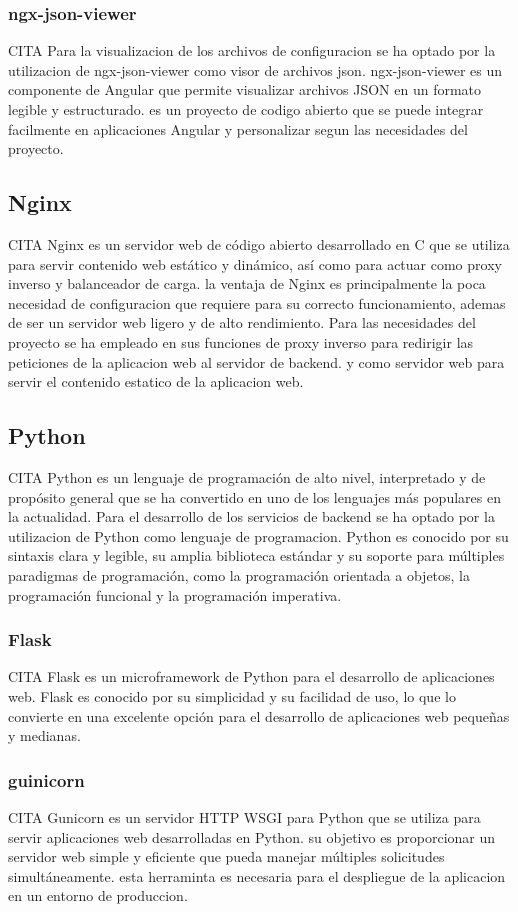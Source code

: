 \documentclass[12pt, a4paper, twoside]{article}
\begin{document}
\subsubsection{ngx-json-viewer}
CITA
Para la visualizacion de los archivos de configuracion se ha optado por la utilizacion de ngx-json-viewer como visor de archivos json.
ngx-json-viewer es un componente de Angular que permite visualizar archivos JSON en un formato legible y estructurado.
es un proyecto de codigo abierto que se puede integrar facilmente en aplicaciones Angular y personalizar segun las necesidades del proyecto.

\subsection{Nginx}
CITA 
Nginx es un servidor web de código abierto desarrollado en C que se utiliza para servir contenido web estático y dinámico, así como para actuar como proxy inverso y balanceador de carga.
la ventaja de Nginx es principalmente la poca necesidad de configuracion que requiere para su correcto funcionamiento, ademas de ser un servidor web ligero y de alto rendimiento.
Para las necesidades del proyecto se ha empleado en sus funciones de proxy inverso para redirigir las peticiones de la aplicacion web al servidor de backend.
y como servidor web para servir el contenido estatico de la aplicacion web.

\subsection{Python}
CITA 
Python es un lenguaje de programación de alto nivel, interpretado y de propósito general que se ha convertido en uno de los lenguajes más populares en la actualidad.
Para el desarrollo de los servicios de backend se ha optado por la utilizacion de Python como lenguaje de programacion.
Python es conocido por su sintaxis clara y legible, su amplia biblioteca estándar y su soporte para múltiples paradigmas de programación, como la programación orientada a objetos, la programación funcional y la programación imperativa.
\subsubsection{Flask}
CITA
Flask es un microframework de Python para el desarrollo de aplicaciones web.
Flask es conocido por su simplicidad y su facilidad de uso, lo que lo convierte en una excelente opción para el desarrollo de aplicaciones web pequeñas y medianas.
\subsubsection{guinicorn}
CITA
Gunicorn es un servidor HTTP WSGI para Python que se utiliza para servir aplicaciones web desarrolladas en Python. su objetivo es proporcionar un servidor web simple y eficiente que pueda manejar múltiples solicitudes simultáneamente.
esta herraminta es necesaria para el despliegue de la aplicacion en un entorno de produccion.
\end{document}
